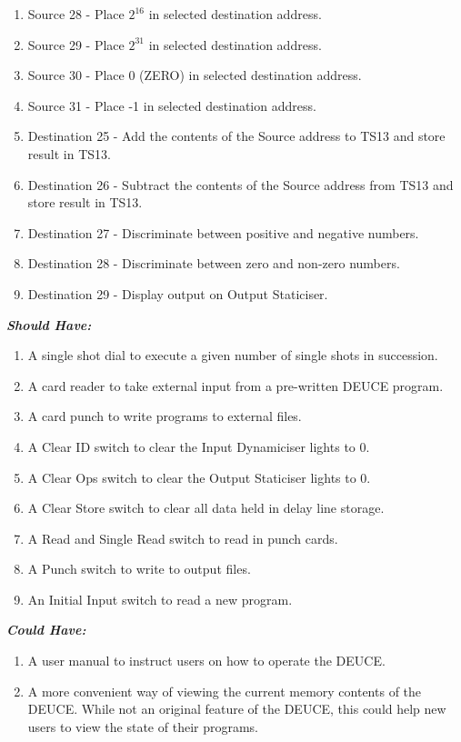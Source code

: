 \documentclass{l4proj}
\begin{document}
\begin{enumerate}
\begin{enumerate}
		\item Source 28 - Place $ 2^{16} $ in selected destination address.
		\item Source 29 - Place $ 2^{31} $ in selected destination address.
		\item Source 30 - Place 0 (ZERO) in selected destination address.
		\item Source 31 - Place -1 in selected destination address.
		\item Destination 25 - Add the contents of the Source address to TS13 and store result in TS13.
		\item Destination 26 - Subtract the contents of the Source address from TS13 and store result in TS13.
		\item Destination 27 - Discriminate between positive and negative numbers.
		\item Destination 28 - Discriminate between zero and non-zero numbers.
		\item Destination 29 - Display output on Output Staticiser.
		
	\end{enumerate}
\end{enumerate}

\textbf{\textit{Should Have:}}
\begin{enumerate}
	\item A single shot dial to execute a given number of single shots in succession.
	\item A card reader to take external input from a pre-written DEUCE program.
	\item A card punch to write programs to external files.
	\item A Clear ID switch to clear the Input Dynamiciser lights to 0.
	\item A Clear Ops switch to clear the Output Staticiser lights to 0.
	\item A Clear Store switch to clear all data held in delay line storage.
	\item A Read and Single Read switch to read in punch cards.
	\item A Punch switch to write to output files.
	\item An Initial Input switch to read a new program.
	
\end{enumerate}

\textbf{\textit{Could Have:}}
\begin{enumerate}
	\item A user manual to instruct users on how to operate the DEUCE.
	\item A more convenient way of viewing the current memory contents of the DEUCE. While not an original feature of the DEUCE, this could help new users to view the state of their programs.
	
\end{enumerate}
\end{document}
